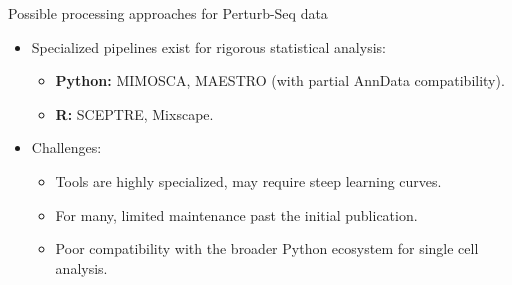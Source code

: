 \documentclass[handout]{beamer}
\begin{document}
\begin{frame}{Possible processing approaches for Perturb-Seq data}
    \begin{itemize}
        \item Specialized pipelines exist for rigorous statistical analysis:
        \begin{itemize}
            \item \textbf{Python:} MIMOSCA, MAESTRO (with partial AnnData compatibility).
            \item \textbf{R:} SCEPTRE, Mixscape.
        \end{itemize}
        \item Challenges:
        \begin{itemize}
            \item Tools are highly specialized, may require steep learning curves.
            \item For many, limited maintenance past the initial publication.
            \item Poor compatibility with the broader Python ecosystem for single cell analysis.
        \end{itemize}
    \end{itemize}
\end{frame}
\end{document}
